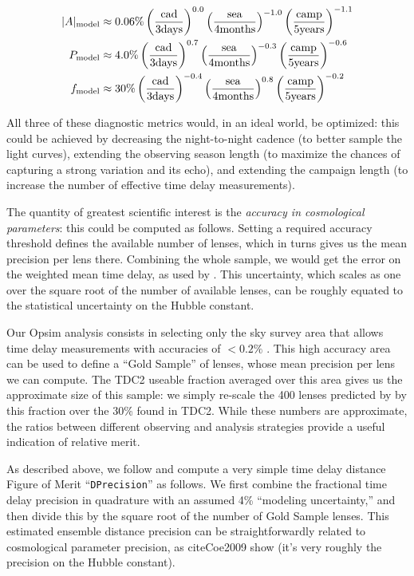 \begin{align}
|A|_{\rm model} &\approx 0.06\% \left(\frac{\rm cad} {\rm 3 days}  \right)^{0.0}
\left(\frac{\rm sea}  {\rm 4 months}\right)^{-1.0}
\left(\frac{\rm camp}{\rm 5 years} \right)^{-1.1}  \notag \\
P_{\rm model} &\approx 4.0\% \left(\frac{\rm cad} {\rm 3 days}  \right)^{ 0.7}
\left(\frac{\rm sea}  {\rm 4 months}\right)^{-0.3}
\left(\frac{\rm camp}{\rm 5 years} \right)^{-0.6}  \notag \\
f_{\rm model} &\approx 30\% \left(\frac{\rm cad} {\rm 3 days}  \right)^{-0.4}
\left(\frac{\rm sea}  {\rm 4 months}\right)^{ 0.8}
\left(\frac{\rm camp}{\rm 5 years} \right)^{-0.2} \notag 
\end{align}

All three of these diagnostic metrics would, in an ideal world, be
optimized: this could be achieved by decreasing the night-to-night
cadence (to better sample the light curves), extending the observing
season length (to maximize the chances of capturing a strong variation
and its echo), and extending the campaign length (to increase the number
of effective time delay measurements).

The quantity of greatest scientific interest is the {\it accuracy in
	cosmological parameters}: this could be computed as follows. Setting a
required accuracy threshold  defines the available number of lenses,
which in turns gives us the mean precision per lens there. Combining the
whole sample, we would get the error on the weighted mean time delay, as
used by \cite{Coe2009}. This uncertainty, which scales as one
over the square root of the number of available lenses,  can be roughly
equated to the statistical uncertainty on the Hubble constant.

Our Opsim analysis consists in selecting only the sky survey area that allows time delay measurements with accuracies of $<0.2\%$ \citep{Hojjati2014}. This high accuracy area can be used
to define a ``Gold Sample'' of lenses, whose mean precision per lens we
can compute. The TDC2 useable fraction averaged over this area gives us
the approximate size of this sample: we simply re-scale the 400 lenses
predicted by \cite{Liao2015} by this fraction over the 30\% found
in TDC2. While these numbers are approximate, the ratios between
different observing and analysis strategies provide a useful indication of relative merit.

As described above, we follow \cite{Coe2009} and compute a
very simple time delay distance Figure of Merit ``\texttt{DPrecision}''
as follows. We first combine the fractional time delay precision in
quadrature with an assumed 4\% ``modeling uncertainty,'' and then divide
this by the square root of the number of Gold Sample lenses. This
estimated ensemble distance precision can be straightforwardly related
to cosmological parameter precision, as cite{Coe2009} show
(it's very roughly the precision on the Hubble constant).

